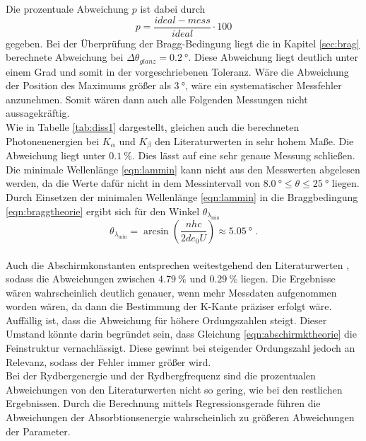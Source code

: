 Die prozentuale Abweichung $p$ ist dabei durch 
\begin{equation*}
  p=\frac{ideal-mess}{ideal}\cdot \num{100}
\end{equation*}
gegeben.
Bei der Überprüfung der Bragg-Bedingung liegt die in Kapitel \ref{sec:brag} berechnete Abweichung bei $\Delta\theta_{glanz}=\SI{0.2}{\degree}$.
Diese Abweichung liegt deutlich unter einem Grad und somit in der vorgeschriebenen Toleranz. Wäre die Abweichung der Position des Maximums 
größer als $\SI{3}{\degree}$, wäre ein systematischer Messfehler anzunehmen. Somit wären dann auch alle Folgenden Messungen nicht aussagekräftig.
\\\noindent
Wie in Tabelle \ref{tab:diss1} dargestellt, gleichen auch die berechneten Photonenenergien bei $K_\alpha$ und $K_\beta$
den Literaturwerten in sehr hohem Maße. Die Abweichung liegt unter $\SI{0.1}{\percent}$. Dies lässt auf eine sehr genaue Messung schließen.
\\\noindent
Die minimale Wellenlänge \eqref{eqn:lammin} kann nicht aus den Messwerten abgelesen werden, da die Werte dafür nicht in dem Messintervall von 
$\SI{8.0}{\degree}\leq\theta\leq\SI{25}{\degree}$ liegen. Durch Einsetzen der minimalen Wellenlänge \eqref{eqn:lammin} in die Braggbedingung
\eqref{eqn:braggtheorie} ergibt sich für den Winkel $\theta_{\lambda_\text{min}}$ 
\begin{equation*}
  \theta_{\lambda_\text{min}}=\arcsin{\left(\frac{nhc}{2de_0U}\right)}\approx\SI{5.05}{\degree} \;.
\end{equation*} 
\\\noindent
Auch die Abschirmkonstanten entsprechen weitestgehend den Literaturwerten \cite{AP05}, sodass die Abweichungen zwischen $\SI{4.79}{\percent}$
und $\SI{0.29}{\percent}$ liegen. Die Ergebnisse wären wahrscheinlich deutlich genauer, wenn mehr Messdaten aufgenommen worden wären, da
dann die Bestimmung der K-Kante präziser erfolgt wäre. Auffällig ist, dass die Abweichung für höhere Ordungszahlen steigt. Dieser Umstand 
könnte darin begründet sein, dass Gleichung \ref{eqn:abschirmktheorie} die Feinstruktur vernachlässigt. Diese gewinnt bei steigender Ordungszahl
jedoch an Relevanz, sodass der Fehler immer größer wird.
\\\noindent
Bei der Rydbergenergie und der Rydbergfrequenz sind die prozentualen Abweichungen von den Literaturwerten \cite{AP06} nicht so gering, wie bei
den restlichen Ergebnissen. Durch die Berechnung mittels Regressionsgerade führen die Abweichungen der Absorbtionsenergie wahrscheinlich
zu größeren Abweichungen der Parameter.


% 